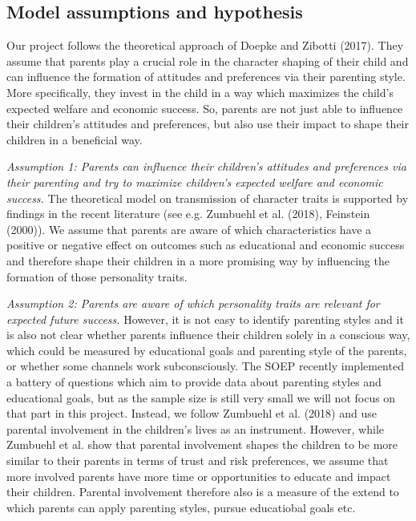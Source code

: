 \documentclass[%
    a4paper,            %
    11pt,               %
    bibliography=totoc, %
]
{scrartcl}
\begin{document}
\subsection{Model assumptions and hypothesis}

Our project follows the theoretical approach of Doepke and Zibotti (2017). They assume that parents play a crucial role in the character shaping of their child and can influence the formation of attitudes and preferences via their parenting style. More specifically, they invest in the child in a way which maximizes the child’s expected welfare and economic success. So, parents are not just able to influence their children’s attitudes and preferences, but also use their impact to shape their children in a beneficial way. \newline

\textit{\centering Assumption 1: Parents can influence their children’s attitudes and preferences via their parenting and try to maximize children’s expected welfare and economic success.}
\newline\newline
The theoretical model on transmission of character traits is supported by findings in the recent literature (see e.g. Zumbuehl et al. (2018), Feinstein (2000)). We assume that parents are aware of which characteristics have a positive or negative effect on outcomes such as educational and economic success and therefore shape their children in a more promising way by influencing the formation of those personality traits. \newline

\textit{\centering Assumption 2: Parents are aware of which personality traits are relevant for expected future success.} \newline \newline
However, it is not easy to identify parenting styles and it is also not clear whether parents influence their children solely in a conscious way, which could be measured by educational goals and parenting style of the parents, or whether some channels work subconsciously. The SOEP recently implemented a battery of questions which aim to provide data about parenting styles and educational goals, but as the sample size is still very small we will not focus on that part in this project. \newline
Instead, we follow Zumbuehl et al. (2018) and use parental involvement in the children’s lives as an instrument. However, while Zumbuehl et al. show that parental involvement shapes the children to be more similar to their parents in terms of trust and risk preferences, we assume that more involved parents have more time or opportunities to educate and impact their children. Parental involvement therefore also is a measure of the extend to which parents can apply parenting styles, pursue educatiobal goals etc.  \newline
\end{document}
